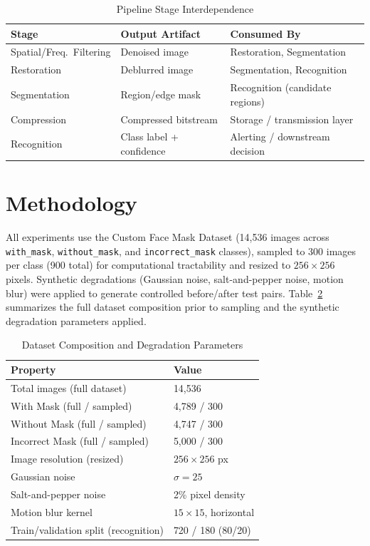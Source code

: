 \documentclass[conference]{IEEEtran}
\begin{document}
\begin{table}[h]
\caption{Pipeline Stage Interdependence}
\label{tab:interdep}
\centering
\begin{tabular}{p{1.6cm}p{2.5cm}p{3.3cm}}
\toprule
Stage & Output Artifact & Consumed By \\
\midrule
Spatial/Freq.\ Filtering & Denoised image & Restoration, Segmentation \\
Restoration & Deblurred image & Segmentation, Recognition \\
Segmentation & Region/edge mask & Recognition (candidate regions) \\
Compression & Compressed bitstream & Storage / transmission layer \\
Recognition & Class label + confidence & Alerting / downstream decision \\
\bottomrule
\end{tabular}
\end{table}

\section{Methodology}
All experiments use the Custom Face Mask Dataset \cite{b4} (14{,}536 images across \texttt{with\_mask}, \texttt{without\_mask}, and \texttt{incorrect\_mask} classes), sampled to 300 images per class (900 total) for computational tractability and resized to $256\times256$ pixels. Synthetic degradations (Gaussian noise, salt-and-pepper noise, motion blur) were applied to generate controlled before/after test pairs. Table~\ref{tab:dataset} summarizes the full dataset composition prior to sampling and the synthetic degradation parameters applied.

\begin{table}[h]
\caption{Dataset Composition and Degradation Parameters}
\label{tab:dataset}
\centering
\begin{tabular}{ll}
\toprule
Property & Value \\
\midrule
Total images (full dataset) & 14,536 \\
With Mask (full / sampled) & 4,789 / 300 \\
Without Mask (full / sampled) & 4,747 / 300 \\
Incorrect Mask (full / sampled) & 5,000 / 300 \\
Image resolution (resized) & $256\times256$ px \\
Gaussian noise & $\sigma = 25$ \\
Salt-and-pepper noise & 2\% pixel density \\
Motion blur kernel & $15\times15$, horizontal \\
Train/validation split (recognition) & 720 / 180 (80/20) \\
\bottomrule
\end{tabular}
\end{table}
\end{document}
